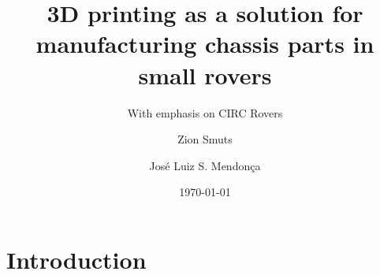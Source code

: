\documentclass{scrartcl}
\title{3D printing as a solution for manufacturing chassis parts in small rovers}
\subtitle{With emphasis on CIRC Rovers}
\author{Zion Smuts}
\author{José Luiz S. Mendonça}
\date{\today}
\begin{document}
	
	\maketitle
	\tableofcontents

	\clearpage

	\section{Introduction}
	
		

	
\end{document}
